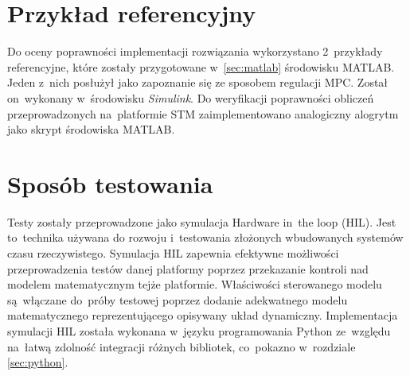 \section{Przykład referencyjny} \label{sec:ref}
Do oceny poprawności implementacji rozwiązania wykorzystano 2~przykłady referencyjne, które zostały
przygotowane w~\ref{sec:matlab} środowisku MATLAB. Jeden z~nich posłużył jako zapoznanie się ze
sposobem regulacji MPC. Został on~wykonany w~środowisku \textit{Simulink}. 
Do weryfikacji poprawności obliczeń przeprowadzonych na~platformie STM zaimplementowano analogiczny
alogrytm jako skrypt środowiska MATLAB. \cite{matlab}

\section{Sposób testowania} \label{sec:tests}
Testy zostały przeprowadzone jako symulacja Hardware in~the loop (HIL). Jest to~technika używana
do rozwoju i~testowania złożonych wbudowanych systemów czasu rzeczywistego. Symulacja HIL zapewnia
efektywne możliwości przeprowadzenia testów danej platformy poprzez przekazanie kontroli nad 
modelem matematycznym tejże platformie. Właściwości sterowanego modelu są~włączane do~próby testowej
poprzez dodanie adekwatnego modelu matematycznego reprezentującego opisywany układ dynamiczny. 
Implementacja symulacji HIL została wykonana w~języku programowania Python ze~względu na~łatwą
zdolność integracji różnych bibliotek, co~pokazno w~rozdziale \ref{sec:python}. \cite{hil}
